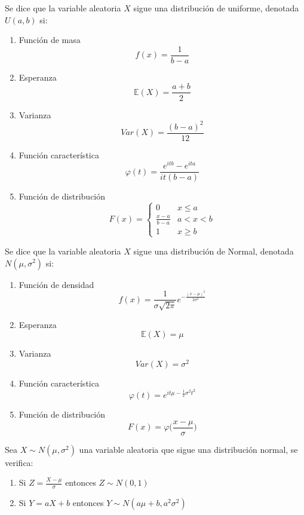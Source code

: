 \begin{defn}[Uniforme]
Se dice que la variable aleatoria $X$ sigue una distribución de uniforme, denotada $U(a,b)$ si:
\begin{enumerate}[label=(\roman*)]
    \item Función de masa \[ f(x) = \frac{1}{b-a} \]
    \item Esperanza \[ \mathbb{E}(X) = \frac{a+b}{2} \]
    \item Varianza \[ Var(X) = \frac{(b-a)^2}{12} \]
    \item Función característica \[ \varphi(t) = \frac{e^{itb} - e^{ita}}{it(b-a)} \]
    \item Función de distribución \[ F(x)  = 
    \begin{cases} 
        0 & x\leq a\\
        \frac{x-a}{b-a} & a< x < b \\
        1 & x \geq b
    \end{cases}\]
\end{enumerate}
\end{defn}

\begin{ejr}[2.34 , Schaum]

\end{ejr}

\begin{defn}[Normal]
Se dice que la variable aleatoria $X$ sigue una distribución de Normal, denotada $N(\mu,\sigma^2)$ si:
\begin{enumerate}[label=(\roman*)]
    \item Función de densidad \[ f(x) = \frac{1}{\sigma\sqrt{2\pi}}e^{-\frac{(x-\mu)^2}{2\sigma^2}} \]
    \item Esperanza \[ \mathbb{E}(X) = \mu \]
    \item Varianza \[ Var(X) = \sigma^2 \]
    \item Función característica \[ \varphi(t) = e^{it\mu-\frac{1}{2}\sigma^2t^2} \]
    \item Función de distribución \[ F(x)  = \varphi\bigg( \frac{x - \mu}{\sigma}\bigg)\]
\end{enumerate}
\end{defn}

\begin{prop}
Sea $X\sim N(\mu,\sigma^2)$ una variable aleatoria que sigue una distribución normal, se verifica:
\begin{enumerate}[label=(\roman*)]
    \item Si $ Z = \frac{X-\mu}{\sigma}$ entonces $Z\sim N(0,1)$
    \item Si $ Y = aX + b$ entonces $Y\sim N(a\mu + b,a^2\sigma^2)$
\end{enumerate}
\end{prop}

